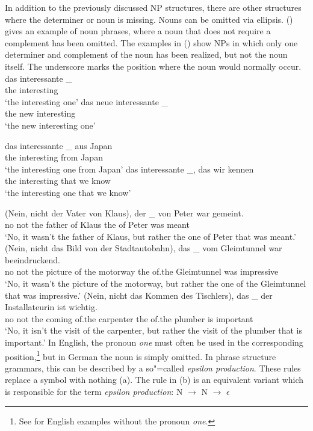 In addition to the previously discussed NP structures, there are other structures where the determiner or noun is missing.
Nouns can be omitted via ellipsis. () gives an example of noun phrases, where a noun that does not require a complement
has been omitted. The examples in () show NPs in which only one determiner and complement of the noun has been realized,
but not the noun itself. The underscore marks the position where the noun would normally occur. 
\eal
\label{ex-nounless-np}
\ex 
\gll das interessante \_\\
     the  interesting\\
\glt `the interesting one'
\ex 
\gll das neue interessante \_\\
     the new  interesting\\
\glt `the new interesting one'

\ex 
\gll das interessante \_ aus  Japan\\
     the interesting   {} from Japan\\
\glt `the interesting one from Japan'
\ex 
\gll das interessante \_, das  wir kennen\\
     the interesting   {}  that we  know\\
\glt `the interesting one that we know'
\zl

\eal
\label{ex-nounless-np-relational-noun}
\ex 
\gll (Nein, nicht der Vater von Klaus), der \_ von Peter war gemeint.\\
	\spacebr{}no not the father of Klaus the {} of Peter was meant\\
\glt `No, it wasn't the father of Klaus, but rather the one of Peter that was meant.'
\ex 
\gll (Nein, nicht das Bild von der Stadtautobahn), das \_ vom Gleimtunnel war beeindruckend.\\
	 \spacebr{}no not the picture of the motorway the {} of.the Gleimtunnel was impressive\\
\glt `No, it wasn't the picture of the motorway, but rather the one of the Gleimtunnel that was impressive.'
\ex 
\gll (Nein, nicht das Kommen des Tischlers), das \_ der Installateurin ist wichtig.\\
	 \spacebr{}no not the coming of.the carpenter the {} of.the plumber is important\\
\glt `No, it isn't the visit of the carpenter, but rather the visit of the plumber that is important.'
\zl
In English, the pronoun
\emph{one} must often be used in the corresponding position,\footnote{%
  See \citet[Section~4.12]{FLGR2012a} for English examples without the
  pronoun \emph{one}.
} but in German the noun is
simply omitted.
In phrase structure grammars, this can be described by a so"=called \emph{epsilon production}.
These rules replace a symbol with nothing (a). The rule in (b) is an equivalent variant which is responsible for the term \emph{epsilon production}:
\eal
\label{np-epsilon}
\ex N $\to$
\ex N $\to$ $\epsilon$
\zl 

